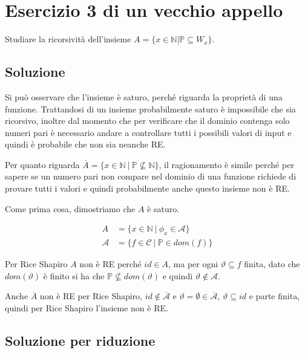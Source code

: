 
\section{Esercizio 3 di un vecchio appello}
 
 Studiare la ricorsività dell'insieme $A = \{ x \in \mathbb{N} | \mathbb{P} \subseteq W_x \}$.
 
 \subsection{Soluzione}
 
 Si può osservare che l'insieme è saturo, perché riguarda la proprietà di una funzione. Trattandosi di un insieme probabilmente saturo è impossibile che sia ricorsivo, inoltre dal momento che per verificare che il dominio contenga solo numeri pari è necessario andare a controllare tutti i possibili valori di input e quindi è probabile che non sia neanche RE.
 
 Per quanto riguarda $\overline{A} = \{ x \in \mathbb{N} \: | \: \mathbb{P} \nsubseteq \mathbb{N}\}$, il ragionamento è simile perché per sapere se un numero pari non compare nel dominio di una funzione richiede di provare tutti i valori e quindi probabilmente anche questo insieme non è RE.
 
 Come prima cosa, dimostriamo che $A$ è saturo.
 
\begin{align*}
 A &= \{ x \in \mathbb{N} \:|\: \phi_x \in \mathcal{A}\} \\
 \mathcal{A} &= \{ f \in \mathcal{C} \:|\: \mathbb{P} \in dom(f) \}
\end{align*}

Per Rice Shapiro $A$ non è RE perché $id \in A$, ma per ogni $\vartheta \subseteq f$ finita, dato che $dom(\vartheta)$ è finito si ha che $\mathbb{P} \nsubseteq dom(\vartheta)$ e quindi $\vartheta \notin \mathcal{A}$.

Anche $\overline{A}$ non è RE per Rice Shapiro, $id \notin \overline{\mathcal{A}}$ e $\vartheta = \emptyset \in  \overline{\mathcal{A}}$, $\vartheta \subseteq id$ e parte finita, quindi per Rice Shapiro l'insieme non è RE.

\subsection{Soluzione per riduzione}

